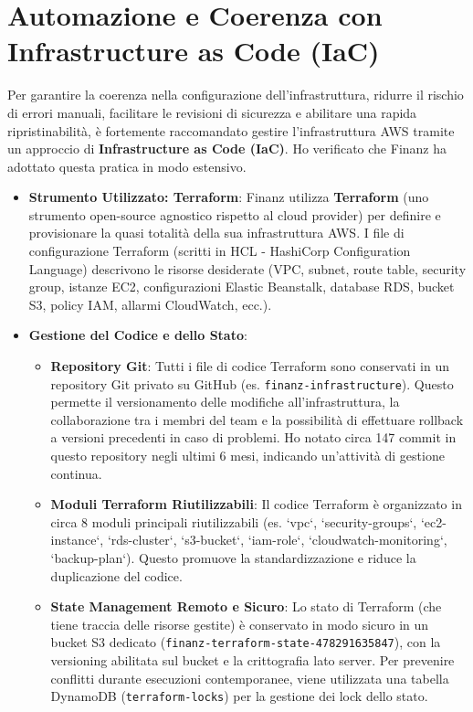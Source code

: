 \section{Automazione e Coerenza con Infrastructure as Code (IaC)}
\label{sec:iac_cap2}
Per garantire la coerenza nella configurazione dell'infrastruttura, ridurre il rischio di errori manuali, facilitare le revisioni di sicurezza e abilitare una rapida ripristinabilità, è fortemente raccomandato gestire l'infrastruttura AWS tramite un approccio di \textbf{Infrastructure as Code (IaC)}. Ho verificato che Finanz ha adottato questa pratica in modo estensivo.
\begin{itemize}
    \item \textbf{Strumento Utilizzato: Terraform}: Finanz utilizza \textbf{Terraform} (uno strumento open-source agnostico rispetto al cloud provider) per definire e provisionare la quasi totalità della sua infrastruttura AWS. I file di configurazione Terraform (scritti in HCL - HashiCorp Configuration Language) descrivono le risorse desiderate (VPC, subnet, route table, security group, istanze EC2, configurazioni Elastic Beanstalk, database RDS, bucket S3, policy IAM, allarmi CloudWatch, ecc.).
    \item \textbf{Gestione del Codice e dello Stato}:
        \begin{itemize}
            \item \textbf{Repository Git}: Tutti i file di codice Terraform sono conservati in un repository Git privato su GitHub (es. \texttt{finanz-infrastructure}). Questo permette il versionamento delle modifiche all'infrastruttura, la collaborazione tra i membri del team e la possibilità di effettuare rollback a versioni precedenti in caso di problemi. Ho notato circa 147 commit in questo repository negli ultimi 6 mesi, indicando un'attività di gestione continua.
            \item \textbf{Moduli Terraform Riutilizzabili}: Il codice Terraform è organizzato in circa 8 moduli principali riutilizzabili (es. `vpc`, `security-groups`, `ec2-instance`, `rds-cluster`, `s3-bucket`, `iam-role`, `cloudwatch-monitoring`, `backup-plan`). Questo promuove la standardizzazione e riduce la duplicazione del codice.
            \item \textbf{State Management Remoto e Sicuro}: Lo stato di Terraform (che tiene traccia delle risorse gestite) è conservato in modo sicuro in un bucket S3 dedicato (\texttt{finanz-terraform-state-478291635847}), con la versioning abilitata sul bucket e la crittografia lato server. Per prevenire conflitti durante esecuzioni contemporanee, viene utilizzata una tabella DynamoDB (\texttt{terraform-locks}) per la gestione dei lock dello stato.

\end{itemize}
\end{itemize}

